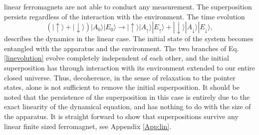 \documentclass[showpacs,preprintnumbers,amsmath,amssymb,12pt]{revtex4-2}
\begin{document}
linear ferromagnets are not able to conduct any measurement. The
superposition persists regardless of the interaction with the
environment. The time evolution
\begin{equation}
  (| \uparrow  \rangle+|\downarrow \rangle)
  |A_{0}\rangle|E_0\rangle 
  \rightarrow 
  | \uparrow  \rangle|A_{\uparrow}\rangle| 
    E_{\uparrow}\rangle+|\downarrow \rangle
  |A_{\downarrow}\rangle|E_{\downarrow}\rangle,
\label{linevolution}
\end{equation}
describes the dynamics in the linear case.  The initial state of the
system becomes entangled with the apparatus and the environment. The
two branches of Eq. \eqref{linevolution} evolve completely independent
of each other, and the initial superposition has through interaction
with its environment extended to our entire closed universe. Thus,
decoherence, in the sense of relaxation to the pointer states, alone
is not sufficient to remove the initial superposition. It should be
noted that the persistence of the superposition in this case is
entirely due to the exact linearity of the dynamical equation, and has
nothing to do with the size of the apparatus. It is straight forward
to show that superpositions survive any linear finite sized
ferromagnet, see Appendix \ref{App:lin}.
\end{document}
